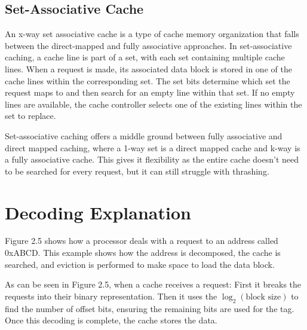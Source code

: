\subsection{Set-Associative Cache}

An x-way set associative cache is a type of cache memory organization that falls between the direct-mapped and fully associative approaches. In set-associative caching, a cache line is part of a set, with each set containing multiple cache lines. When a request is made, its associated data block is stored in one of the cache lines within the corresponding set. The set bits determine which set the request maps to and then search for an empty line within that set. If no empty lines are available, the cache controller selects one of the existing lines within the set to replace.



Set-associative caching offers a middle ground between fully associative and direct mapped caching, where a 1-way set is a direct mapped cache and k-way is a fully associative cache. This gives it flexibility as the entire cache doesn't need to be searched for every request, but it can still struggle with thrashing.

\section{Decoding Explanation}
Figure 2.5 shows how a processor deals with a request to an address called 0xABCD. This example shows how the address is decomposed, the cache is searched, and eviction is performed to make space to load the data block.


As can be seen in Figure 2.5, when a cache receives a request: First it breaks the requests into their binary representation. Then it uses the $\log_2(\text{block size})$ to find the number of offset bits, ensuring the remaining bits are used for the tag. Once this decoding is complete, the cache stores the data.

